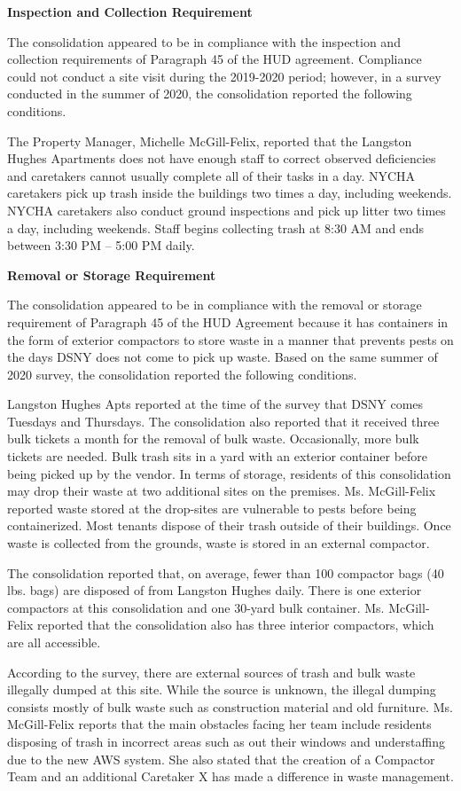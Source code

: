 
\textbf{Inspection and Collection Requirement}

The consolidation appeared to be in compliance with the inspection and collection requirements of Paragraph 45 of the HUD agreement. Compliance could not conduct a site visit during the 2019-2020 period; however, in a survey conducted in the summer of 2020, the consolidation reported the following conditions.

The Property Manager, Michelle McGill-Felix, reported that the Langston Hughes Apartments does not have enough staff to correct observed deficiencies and caretakers cannot usually complete all of their tasks in a day. NYCHA caretakers pick up trash inside the buildings two times a day, including weekends. NYCHA caretakers also conduct ground inspections and pick up litter two times a day, including weekends. Staff begins collecting trash at 8:30 AM and ends between 3:30 PM -- 5:00 PM daily.

\textbf{Removal or Storage Requirement}

The consolidation appeared to be in compliance with the  removal or storage requirement of Paragraph  45 of the HUD Agreement because it has containers in the form of exterior compactors to store waste in a manner that prevents pests on the days DSNY does not come to pick up waste. Based on the same summer of  2020 survey, the consolidation reported the following conditions.

Langston Hughes Apts reported at the time of the survey that DSNY comes Tuesdays and Thursdays. The consolidation also reported that it received three bulk tickets a month for the removal of bulk waste. Occasionally, more bulk tickets are needed. Bulk trash sits in a yard with an exterior container before being picked up by the vendor. In terms of storage, residents of this consolidation may drop their waste at two additional sites on the premises. Ms. McGill-Felix reported waste stored at the drop-sites are vulnerable to pests before being containerized. Most tenants dispose of their trash outside of their buildings. Once waste is collected from the grounds, waste is stored in an external compactor. 

The consolidation reported that, on average, fewer than 100 compactor bags (40 lbs. bags) are disposed of from Langston Hughes daily. There is one exterior compactors at this consolidation and one 30-yard bulk container. Ms. McGill-Felix reported that the consolidation also has three interior compactors, which are all accessible.

According to the survey, there are external sources of trash and bulk waste illegally dumped at this site. While the source is unknown, the illegal dumping consists mostly of bulk waste such as construction material and old furniture. Ms. McGill-Felix reports that the main obstacles facing her team include residents disposing of trash in incorrect areas such as out their windows and understaffing due to the new AWS system. She also stated that the creation of a Compactor Team and an additional Caretaker X has made a difference in waste management.